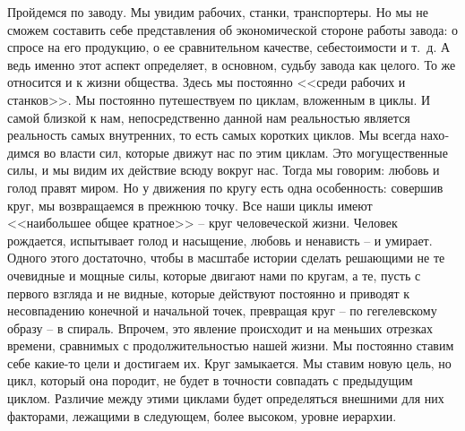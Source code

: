 \documentclass{book}
\begin{document}
Пройдемся по заводу. Мы увидим рабочих, станки, транспор­теры. Но мы не сможем составить себе представления об экономической стороне работы завода: о спросе на его продукцию, о ее сравнительном качестве, себестоимости и т.~д. А ведь именно этот аспект определяет, в основном, судьбу завода как целого. То же относится и к жизни общества. Здесь мы постоянно <<среди рабочих и станков>>. Мы постоянно путешествуем по циклам, вложенным в циклы. И самой близкой к нам, непос­редственно данной нам реальностью является реальность самых внутренних, то есть самых коротких циклов. Мы всегда нахо­димся во власти сил, которые движут нас по этим циклам. Это могущественные силы, и мы видим их действие всюду вокруг нас. Тогда мы говорим: любовь и голод правят миром. Но у движения по кругу есть одна особенность: совершив круг, мы возвращаемся в прежнюю точку. Все наши циклы имеют <<наибольшее общее кратное>> -- круг человеческой жизни. Человек рождается, испытывает голод и насыщение, любовь и нена­висть -- и умирает. Одного 
этого 
достаточно, чтобы в масштабе истории сделать решающими не те очевидные и мощные силы, которые двигают нами по кругам, а те, пусть с первого взгляда и не видные, которые действуют постоянно и приводят к несовпадению конечной и начальной точек, превращая круг -- по гегелевскому образу -- в спираль. Впрочем, это явление происходит и на меньших отрезках времени, сравнимых с про­должительностью нашей жизни. Мы постоянно ставим себе ка­кие-то цели и достигаем их. Круг замыкается. Мы ставим новую цель, но цикл, который она породит, не будет в точности сов­падать с предыдущим циклом. Различие между этими циклами будет определяться внешними для них факторами, лежащими в следующем, более высоком, уровне иерархии.
\end{document}
